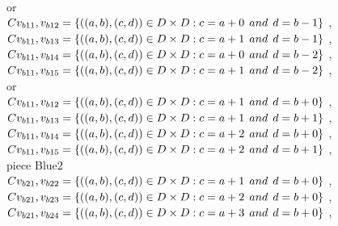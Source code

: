 \\or
\\$C{v_{b11},v_{b12}}=\{((a,b),(c,d))\in D\times D: c = a + 0\hspace{1ex} and \hspace{1ex}  d = b - 1 \}$ , 
\\$C{v_{b11},v_{b13}}=\{((a,b),(c,d))\in D\times D: c = a + 1\hspace{1ex} and \hspace{1ex}  d = b - 1 \}$ , 
\\$C{v_{b11},v_{b14}}=\{((a,b),(c,d))\in D\times D: c = a + 0\hspace{1ex} and \hspace{1ex}  d = b - 2 \}$ , 
\\$C{v_{b11},v_{b15}}=\{((a,b),(c,d))\in D\times D: c = a + 1\hspace{1ex} and \hspace{1ex}  d = b - 2 \}$ , 
\\or
\\$C{v_{b11},v_{b12}}=\{((a,b),(c,d))\in D\times D: c = a + 1\hspace{1ex} and \hspace{1ex}  d = b + 0 \}$ , 
\\$C{v_{b11},v_{b13}}=\{((a,b),(c,d))\in D\times D: c = a + 1\hspace{1ex} and \hspace{1ex}  d = b + 1 \}$ , 
\\$C{v_{b11},v_{b14}}=\{((a,b),(c,d))\in D\times D: c = a + 2\hspace{1ex} and \hspace{1ex}  d = b + 0 \}$ , 
\\$C{v_{b11},v_{b15}}=\{((a,b),(c,d))\in D\times D: c = a + 2\hspace{1ex} and \hspace{1ex}  d = b + 1 \}$ , 
\\ piece Blue2 
\\$C{v_{b21},v_{b22}}=\{((a,b),(c,d))\in D\times D: c = a + 1\hspace{1ex} and \hspace{1ex}  d = b + 0 \}$ , 
\\$C{v_{b21},v_{b23}}=\{((a,b),(c,d))\in D\times D: c = a + 2\hspace{1ex} and \hspace{1ex}  d = b + 0 \}$ , 
\\$C{v_{b21},v_{b24}}=\{((a,b),(c,d))\in D\times D: c = a + 3\hspace{1ex} and \hspace{1ex}  d = b + 0 \}$ , 
